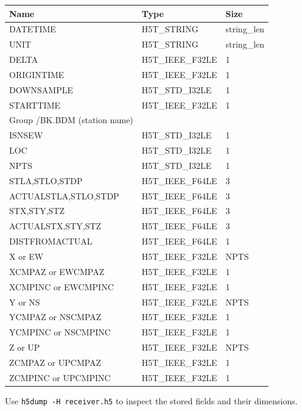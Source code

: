 \documentclass[11pt]{report}
\begin{document}
\begin{center}
\begin{tabular}{lll}\hline
Name & Type & Size \\ \hline
  DATETIME & H5T\_STRING & string\_len \\ \hline
  UNIT & H5T\_STRING & string\_len \\ \hline
  DELTA & H5T\_IEEE\_F32LE & 1 \\ \hline
  ORIGINTIME & H5T\_IEEE\_F32LE & 1 \\ \hline
  DOWNSAMPLE & H5T\_STD\_I32LE & 1 \\ \hline
  STARTTIME & H5T\_IEEE\_F32LE & 1 \\ \hline
Group /BK.BDM (station name) \\ \hline
  ISNSEW & H5T\_STD\_I32LE & 1  \\ \hline
  LOC & H5T\_STD\_I32LE & 1  \\ \hline
  NPTS & H5T\_STD\_I32LE & 1  \\ \hline
  STLA,STLO,STDP & H5T\_IEEE\_F64LE & 3 \\ \hline
  ACTUALSTLA,STLO,STDP & H5T\_IEEE\_F64LE & 3 \\ \hline
  STX,STY,STZ & H5T\_IEEE\_F64LE & 3 \\ \hline
  ACTUALSTX,STY,STZ & H5T\_IEEE\_F64LE & 3 \\ \hline
  DISTFROMACTUAL & H5T\_IEEE\_F64LE & 1\\ \hline
  X or EW & H5T\_IEEE\_F32LE & NPTS \\ \hline
  XCMPAZ or EWCMPAZ & H5T\_IEEE\_F32LE & 1\\ \hline
  XCMPINC or EWCMPINC & H5T\_IEEE\_F32LE & 1\\ \hline
  Y or NS & H5T\_IEEE\_F32LE & NPTS \\ \hline
  YCMPAZ or NSCMPAZ & H5T\_IEEE\_F32LE & 1\\ \hline
  YCMPINC or NSCMPINC & H5T\_IEEE\_F32LE & 1\\ \hline
  Z or UP & H5T\_IEEE\_F32LE & NPTS \\ \hline
  ZCMPAZ or UPCMPAZ & H5T\_IEEE\_F32LE & 1\\ \hline
  ZCMPINC or UPCMPINC & H5T\_IEEE\_F32LE & 1\\ \hline
\end{tabular}
\end{center}

Use \texttt{h5dump -H receiver.h5} to inspect the stored fields and their dimensions.

\end{document}
